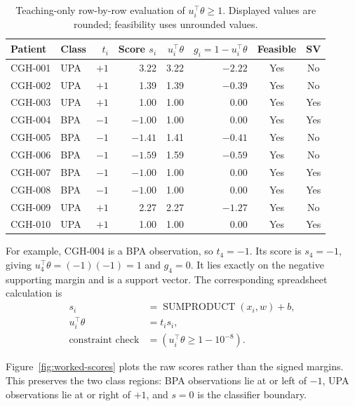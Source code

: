 \documentclass[11pt,a4paper]{article}
\numberwithin{equation}{section} %
\begin{document}
\begin{table}[htbp]
\centering
\caption{Teaching-only row-by-row evaluation of $u_i^{\top}\theta\geq1$. Displayed values are rounded; feasibility uses unrounded values.}
\label{tab:worked-excel}
\scriptsize
\begin{tabular}{@{}llrrrrcc@{}}
\toprule
Patient & Class & $t_i$ & Score $s_i$ & $u_i^{\top}\theta$ & $g_i=1-u_i^{\top}\theta$ & Feasible & SV \\
\midrule
CGH-001 & UPA & $+1$ &  3.22 & 3.22 & $-2.22$ & Yes & No \\
CGH-002 & UPA & $+1$ &  1.39 & 1.39 & $-0.39$ & Yes & No \\
CGH-003 & UPA & $+1$ &  1.00 & 1.00 &  0.00 & Yes & Yes \\
CGH-004 & BPA & $-1$ & $-1.00$ & 1.00 &  0.00 & Yes & Yes \\
CGH-005 & BPA & $-1$ & $-1.41$ & 1.41 & $-0.41$ & Yes & No \\
CGH-006 & BPA & $-1$ & $-1.59$ & 1.59 & $-0.59$ & Yes & No \\
CGH-007 & BPA & $-1$ & $-1.00$ & 1.00 &  0.00 & Yes & Yes \\
CGH-008 & BPA & $-1$ & $-1.00$ & 1.00 &  0.00 & Yes & Yes \\
CGH-009 & UPA & $+1$ &  2.27 & 2.27 & $-1.27$ & Yes & No \\
CGH-010 & UPA & $+1$ &  1.00 & 1.00 &  0.00 & Yes & Yes \\
\bottomrule
\end{tabular}
\end{table}

For example, CGH-004 is a BPA observation, so $t_4=-1$. Its score is $s_4=-1$, giving $u_4^{\top}\theta=(-1)(-1)=1$ and $g_4=0$. It lies exactly on the negative supporting margin and is a support vector. The corresponding spreadsheet calculation is
\begin{equation}
\begin{aligned}
s_i&=\operatorname{SUMPRODUCT}(x_i,w)+b,\\
u_i^{\top}\theta&=t_i s_i,\\
\text{constraint check}&=(u_i^{\top}\theta\geq1-10^{-8}).
\end{aligned}
\end{equation}

Figure~\ref{fig:worked-scores} plots the raw scores rather than the signed margins. This preserves the two class regions: BPA observations lie at or left of $-1$, UPA observations lie at or right of $+1$, and $s=0$ is the classifier boundary.
\end{document}
